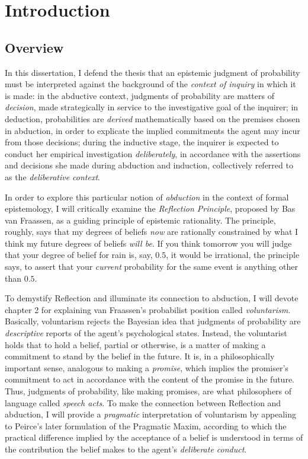 
\hypertarget{introduction}{%
\chapter{Introduction}\label{ch:introduction}}
\hypertarget{overview}{%
\section{Overview}\label{overview}}

In this dissertation, I defend the thesis that an epistemic judgment of
probability must be interpreted against the background of the
\emph{context of inquiry} in which it is made: in the abductive context,
judgments of probability are matters of \emph{decision}, made
strategically in service to the investigative goal of the inquirer; in
deduction, probabilities are \emph{derived} mathematically based on the
premises chosen in abduction, in order to explicate the implied
commitments the agent may incur from those decisions; during the
inductive stage, the inquirer is expected to conduct her empirical
investigation \emph{deliberately}, in accordance with the assertions and
decisions she made during abduction and induction, collectively referred
to as the \emph{deliberative context}.

In order to explore this particular notion of \emph{abduction} in the
context of formal epistemology, I will critically examine the
\emph{Reflection Principle}, proposed by Bas van Fraassen, as a guiding
principle of epistemic rationality. The principle, roughly, says that my
degrees of beliefs \emph{now} are rationally constrained by what I think
my future degrees of beliefs \emph{will be}. If you think tomorrow you
will judge that your degree of belief for rain is, say, \(0.5\), it
would be irrational, the principle says, to assert that your \emph{current}
probability for the same event is anything other than \(0.5\).

To demystify Reflection and illuminate its connection to abduction, I
will devote chapter 2 for explaining van Fraassen's probabilist position
called \emph{voluntarism}. Basically, voluntarism rejects the Bayesian
idea that judgments of probability are \emph{descriptive} reports of the
agent's psychological states. Instead, the voluntarist holds that to hold
a belief, partial or otherwise, is a matter of making a commitment to
stand by the belief in the future. It is, in a philosophically important
sense, analogous to making a \emph{promise}, which implies the
promiser's commitment to act in accordance with the content of the promise in the future. Thus, judgments of probability, like making promises, are what philosophers of language called \emph{speech acts}. To make the connection
between Reflection and abduction, I will provide a \emph{pragmatic}
interpretation of voluntarism by appealing to Peirce's later
formulation of the Pragmatic Maxim, according to which the practical difference implied by the acceptance of a belief is understood in terms of the contribution the belief makes to the agent's \emph{deliberate conduct}.

